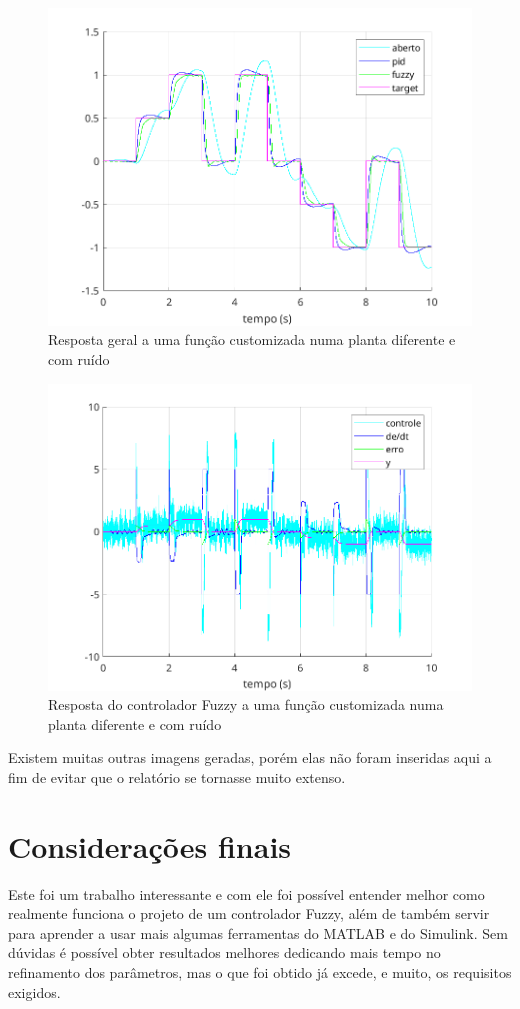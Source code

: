 \documentclass[12pt]{article}
\begin{document}
\begin{figure}
    \centering
    \includegraphics{fig/custom_ruido_1.png}
    \caption{Resposta geral a uma função customizada numa planta diferente e com ruído}
\end{figure}

\begin{figure}
    \centering
    \includegraphics{fig/custom_ruido_1_fuzzy.png}
    \caption{Resposta do controlador Fuzzy a uma função customizada numa planta diferente e com ruído}
\end{figure}

Existem muitas outras imagens geradas, porém elas não foram inseridas aqui a fim de evitar que o relatório se tornasse muito extenso.

\section{Considerações finais}

Este foi um trabalho interessante e com ele foi possível entender melhor como realmente funciona o projeto de um controlador Fuzzy, além de também servir para aprender a usar mais algumas ferramentas do MATLAB e do Simulink. Sem dúvidas é possível obter resultados melhores dedicando mais tempo no refinamento dos parâmetros, mas o que foi obtido já excede, e muito, os requisitos exigidos.
\end{document}
